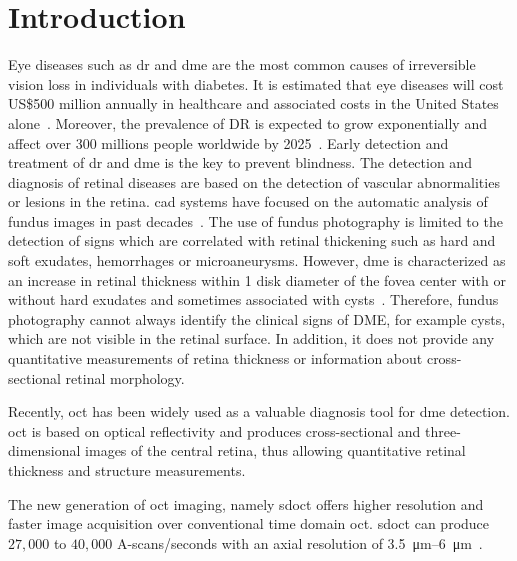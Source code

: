 \graphicspath{ {./content/intro/figures/} }

\section{Introduction}

Eye diseases such as \ac{dr} and \ac{dme} are the most common causes of irreversible vision loss in individuals with diabetes. It is estimated that eye diseases will cost US\$500 million annually in healthcare and associated costs in the United States alone~\cite{Sharma2005}. Moreover, the prevalence of DR is expected to grow exponentially and affect over 300 millions people worldwide by 2025~\cite{Wild2004}.
Early detection and treatment of \ac{dr} and \ac{dme} is the key to prevent blindness.
The detection and diagnosis of retinal diseases are based on the detection of vascular abnormalities or lesions in the retina. \Ac{cad} systems have focused on the automatic analysis of fundus images in past decades~\cite{Abramoff2010,Trucco2013}.
The use of fundus photography is limited to the detection of signs which are correlated with retinal thickening such as hard and soft exudates, hemorrhages or microaneurysms.
However, \ac{dme} is characterized as an increase in retinal thickness within 1 disk diameter of the fovea center with or without hard exudates and sometimes associated with cysts~\cite{ETDRSG1985}.
Therefore, fundus photography cannot always identify the clinical signs of DME, for example cysts, which are not visible in the retinal surface. In addition, it does not provide any quantitative measurements of retina thickness or information about cross-sectional retinal morphology. 

Recently, \ac{oct} has been widely used as a valuable diagnosis tool for \ac{dme} detection.
\ac{oct} is based on optical reflectivity and produces cross-sectional and three-dimensional images of the central retina, thus allowing quantitative retinal thickness and structure measurements. 

The new generation of \ac{oct} imaging, namely \ac{sdoct} offers higher resolution and faster image acquisition over conventional time domain \ac{oct}. \Ac{sdoct} can produce $27,000$ to $40,000$ A-scans/seconds with an axial resolution of \SIrange{3.5}{6}{\micro \metre}~\cite{Chen2005}. 

